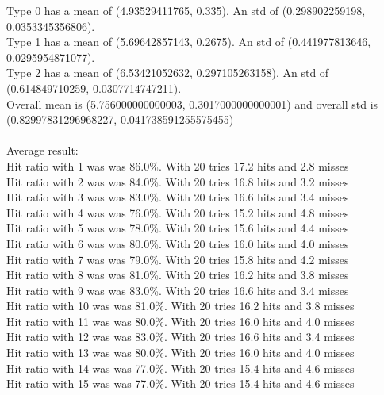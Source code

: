 \documentclass{article}
\begin{document}
Type 0 has a mean of (4.93529411765, 0.335). An std of (0.298902259198, 0.0353345356806).\\
Type 1 has a mean of (5.69642857143, 0.2675). An std of (0.441977813646, 0.0295954871077).\\
Type 2 has a mean of (6.53421052632, 0.297105263158). An std of (0.614849710259, 0.0307714747211).\\
Overall mean is (5.756000000000003, 0.3017000000000001) and overall std is (0.82997831296968227, 0.041738591255575455)\\\\
Average result: \\
Hit ratio with 1 was   {\color{green}was 86.0\%}. With 20 tries 17.2 hits and 2.8 misses\\
Hit ratio with 2 was   {\color{green}was 84.0\%}. With 20 tries 16.8 hits and 3.2 misses\\
Hit ratio with 3 was   {\color{green}was 83.0\%}. With 20 tries 16.6 hits and 3.4 misses\\
Hit ratio with 4 was   {\color{green}was 76.0\%}. With 20 tries 15.2 hits and 4.8 misses\\
Hit ratio with 5 was   {\color{green}was 78.0\%}. With 20 tries 15.6 hits and 4.4 misses\\
Hit ratio with 6 was   {\color{green}was 80.0\%}. With 20 tries 16.0 hits and 4.0 misses\\
Hit ratio with 7 was   {\color{green}was 79.0\%}. With 20 tries 15.8 hits and 4.2 misses\\
Hit ratio with 8 was   {\color{green}was 81.0\%}. With 20 tries 16.2 hits and 3.8 misses\\
Hit ratio with 9 was   {\color{green}was 83.0\%}. With 20 tries 16.6 hits and 3.4 misses\\
Hit ratio with 10 was  {\color{green}was 81.0\%}. With 20 tries 16.2 hits and 3.8 misses\\
Hit ratio with 11 was  {\color{green}was 80.0\%}. With 20 tries 16.0 hits and 4.0 misses\\
Hit ratio with 12 was  {\color{green}was 83.0\%}. With 20 tries 16.6 hits and 3.4 misses\\
Hit ratio with 13 was  {\color{green}was 80.0\%}. With 20 tries 16.0 hits and 4.0 misses\\
Hit ratio with 14 was  {\color{green}was 77.0\%}. With 20 tries 15.4 hits and 4.6 misses\\
Hit ratio with 15 was  {\color{green}was 77.0\%}. With 20 tries 15.4 hits and 4.6 misses\\
\end{document}
